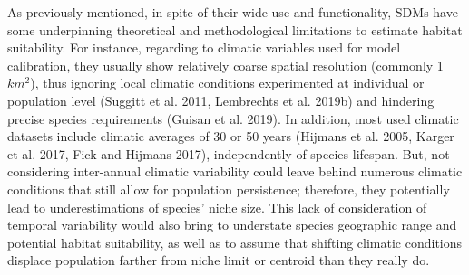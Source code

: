 \documentclass[11pt,twoside]{reedthesis}
\begin{document}
As previously mentioned, in spite of their wide use and functionality,
SDMs have some underpinning theoretical and methodological limitations
to estimate habitat suitability. For instance, regarding to climatic
variables used for model calibration, they usually show relatively
coarse spatial resolution (commonly 1 \(km^2\)), thus ignoring local
climatic conditions experimented at individual or population level
(Suggitt et al. 2011, Lembrechts et al. 2019b) and hindering precise
species requirements (Guisan et al. 2019). In addition, most used
climatic datasets include climatic averages of 30 or 50 years (Hijmans
et al. 2005, Karger et al. 2017, Fick and Hijmans 2017), independently
of species lifespan. But, not considering inter-annual climatic
variability could leave behind numerous climatic conditions that still
allow for population persistence; therefore, they potentially lead to
underestimations of species' niche size. This lack of consideration of
temporal variability would also bring to understate species geographic
range and potential habitat suitability, as well as to assume that
shifting climatic conditions displace population farther from niche
limit or centroid than they really do. \par
\end{document}
